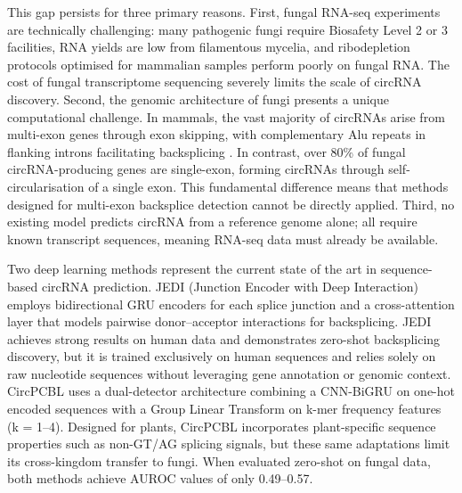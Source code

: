 \documentclass[12pt]{article}
\begin{document}
This gap persists for three primary reasons. First, fungal RNA-seq experiments are technically challenging: many pathogenic fungi require Biosafety Level 2 or 3 facilities, RNA yields are low from filamentous mycelia, and ribodepletion protocols optimised for mammalian samples perform poorly on fungal RNA. The cost of fungal transcriptome sequencing severely limits the scale of circRNA discovery. Second, the genomic architecture of fungi presents a unique computational challenge. In mammals, the vast majority of circRNAs arise from multi-exon genes through exon skipping, with complementary Alu repeats in flanking introns facilitating backsplicing \cite{jeck2013circular, liang2014short}. In contrast, over 80\% of fungal circRNA-producing genes are single-exon, forming circRNAs through self-circularisation of a single exon. This fundamental difference means that methods designed for multi-exon backsplice detection cannot be directly applied. Third, no existing model predicts circRNA from a reference genome alone; all require known transcript sequences, meaning RNA-seq data must already be available.

Two deep learning methods represent the current state of the art in sequence-based circRNA prediction. JEDI (Junction Encoder with Deep Interaction) \cite{jiang2021jedi} employs bidirectional GRU encoders for each splice junction and a cross-attention layer that models pairwise donor--acceptor interactions for backsplicing. JEDI achieves strong results on human data and demonstrates zero-shot backsplicing discovery, but it is trained exclusively on human sequences and relies solely on raw nucleotide sequences without leveraging gene annotation or genomic context. CircPCBL \cite{wu2023circpcbl} uses a dual-detector architecture combining a CNN-BiGRU on one-hot encoded sequences with a Group Linear Transform on k-mer frequency features (k = 1--4). Designed for plants, CircPCBL incorporates plant-specific sequence properties such as non-GT/AG splicing signals, but these same adaptations limit its cross-kingdom transfer to fungi. When evaluated zero-shot on fungal data, both methods achieve AUROC values of only 0.49--0.57.
\end{document}
